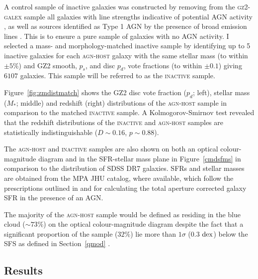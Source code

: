 A control sample of inactive galaxies was constructed by removing from the \textsc{gz2-galex} sample all galaxies with line strengths indicative of potential AGN activity \citep{kauffmann03b}, as well as sources identified as Type 1 AGN by the presence of broad emission lines \citep{Oh15}. This is to ensure a pure sample of galaxies with no AGN activity. I selected a mass- and morphology-matched inactive sample by identifying up to 5 inactive galaxies for each \textsc{agn-host} galaxy with the same stellar mass (to within $\pm5\%$) and GZ2 smooth, $p_s$, and disc $p_d$,  vote fractions (to within $\pm 0.1$) giving $6107$ galaxies. This sample will be referred to as the \textsc{inactive} sample. 


Figure~\ref{fig:zmdistmatch} shows the GZ2 disc vote fraction ($p_d$; left), stellar mass ($M_*$; middle) and redshift (right) distributions of the \textsc{agn-host} sample in comparison to the matched \textsc{inactive} sample. A Kolmogorov-Smirnov test revealed that the redshift distributions of the \textsc{inactive} and \textsc{agn-host} samples are statistically indistinguishable ($D \sim 0.16$, $p \sim 0.88$). 

The \textsc{agn-host} and \textsc{inactive}  samples are also shown on both an optical colour-magnitude diagram and in the SFR-stellar mass plane in Figure~\ref{cmdsfms} in comparison to the distribution of SDSS DR7 galaxies. SFRs and stellar masses are obtained from the MPA JHU catalog, where available, which follow the prescriptions outlined in \cite{brinchmann04} and \cite{Salim07} for calculating the total aperture corrected galaxy SFR in the presence of an AGN. 

The majority of the \textsc{agn-host} sample would be defined as residing in the blue cloud ($\sim73\%$) on the optical colour-magnitude diagram despite the fact that a significant proportion of the sample ($32\%$) lie more than $1\sigma$ ($0.3$ $\rm{dex}$) below the SFS as defined in Section~\ref{qmod} \citep[][see Figure \ref{cmdsfms} and Table~\ref{table:agnqsubs}]{peng10}.

\subsection{Results}\label{results}

